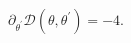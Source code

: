\begin{equation}
\partial _{\theta ^{\prime }}\mathcal{D}\left( \theta ,\theta ^{\prime
}\right) =-4.  \label{eqmvtf}
\end{equation}

